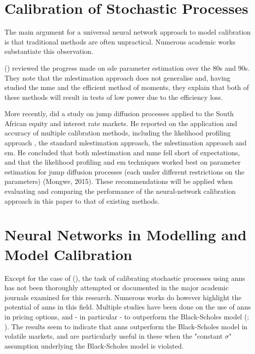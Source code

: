 \documentclass[11pt,oneside,openany,a4paper,english, report, goldenblock
]{usthesis}
\begin{document}
\section{Calibration of Stochastic Processes}
The main argument for a universal neural network approach to model calibration is that traditional methods are often unpractical. Numerous academic works substantiate this observation.


 (\citeyear{Nielsen}) reviewed the progress made on \acrshort{sde} parameter estimation over the 80s and 90s. They note that the \acrshort{mlestimation} approach does not generalise and, having studied the \acrshort{mme} and the efficient method of moments, they explain that both of these methods will result in tests of low power due to the efficiency loss.


More recently, \citet{Mongwe} did a study on jump diffusion processes applied to the South African equity and interest rate markets. He reported on the application and accuracy of multiple calibration methods, including the likelihood profiling approach \citep{Honore}, the standard \acrshort{mlestimation} approach, the \acrshort{mlestimation} approach and \acrfull{em}. He concluded that both \acrshort{mlestimation} and \acrshort{mme} fell short of expectations, and that the likelihood profiling and \acrshort{em} techniques worked best on parameter estimation for jump diffusion processes (each under different restrictions on the parameters) (Mongwe, 2015). These recommendations will be applied when evaluating and comparing the performance of the neural-network calibration approach in this paper to that of existing methods.


\section{Neural Networks in Modelling and Model Calibration}
Except for the case of  (\citeyear{Xie}), the task of calibrating stochastic processes using \acrshort{ann}s has not been thoroughly attempted or documented in the major academic journals examined for this research. Numerous works do however highlight the potential of \acrshort{ann}s in this field.
Multiple studies have been done on the use of \acrshort{ann}s in pricing options, and - in particular - to outperform the Black-Scholes model (; \citeyear{Yao}). The results seem to indicate that \acrshort{ann}s outperform the Black-Scholes model in volatile markets, and are particularly useful in these when the "constant $\sigma$" assumption underlying the Black-Scholes model is violated.
\end{document}
